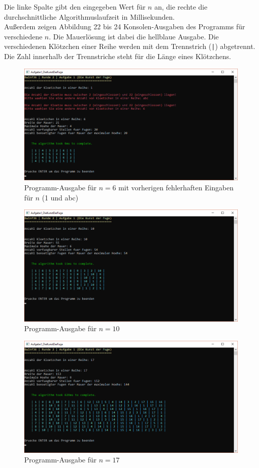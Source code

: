 \documentclass[a4paper,12pt]{article}
\newcommand{\code}{\texttt}
\begin{document}
Die linke Spalte gibt den eingegeben Wert für $n$ an, die rechte die durchschnittliche Algorithmuslaufzeit in Millisekunden.
\\[0.4cm]
Außerdem zeigen Abbildung 22 bis 24 Konsolen-Ausgaben des Programms für verschiedene $n$.
Die Mauerlösung ist dabei die hellblaue Ausgabe. Die verschiedenen Klötzchen einer Reihe werden mit dem Trennstrich (\code{|}) abgetrennt. Die Zahl innerhalb der Trennstriche steht für die Länge eines Klötzchens.
\begin{figure}[H]
    \centering
    \includegraphics[width=1\linewidth]{Bilder/Aufgabe1/Programm_6.png}
    \caption{Programm-Ausgabe für $n = 6$ mit vorherigen fehlerhaften Eingaben für $n$ (1 und abc)}
\end{figure}
\begin{figure}[H]
    \centering
    \includegraphics[width=1\linewidth]{Bilder/Aufgabe1/Programm_10.png}
    \caption{Programm-Ausgabe für $n = 10$}
\end{figure}
\begin{figure}[H]
    \centering
    \includegraphics[width=1\linewidth]{Bilder/Aufgabe1/Programm_17.png}
    \caption{Programm-Ausgabe für $n = 17$}
\end{figure}
\end{document}
